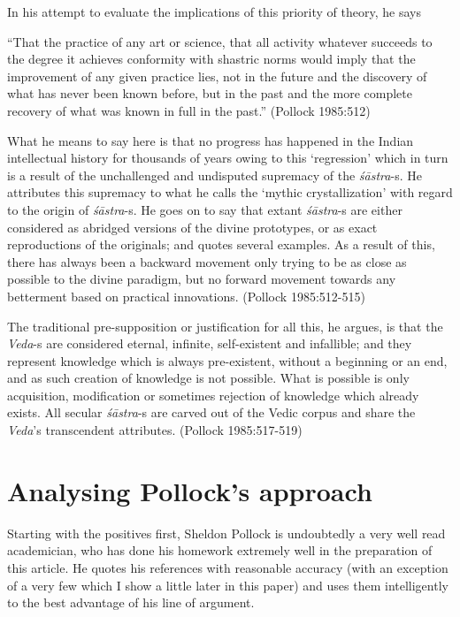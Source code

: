 In his attempt to evaluate the implications of this priority of theory, he says
\begin{myquote}
``That the practice of any art or science, that all activity whatever succeeds to the degree it achieves conformity with shastric norms would imply that the improvement of any given practice lies, not in the future and the discovery of what has never been known before, but in the past and the more complete recovery of what was known in full in the past.'' (Pollock 1985:512)
\end{myquote}

What he means to say here is that no progress has happened in the Indian intellectual history for thousands of years owing to this `regression' which in turn is a result of the unchallenged and undisputed supremacy of the {\sl śāstra}-s. He attributes this supremacy to what he calls the `mythic crystallization' with regard to the origin of {\sl śāstra}-s. He goes on to say that extant {\sl śāstra}-s are either considered as abridged versions of the divine prototypes, or as exact reproductions of the originals; and quotes several examples. As a result of this, there has always been a backward movement only trying to be as close as possible to the divine paradigm, but no forward movement towards any betterment based on practical innovations. (Pollock 1985:512-515)

The traditional pre-supposition or justification for all this, he argues, is that the {\sl Veda}-s are considered eternal, infinite, self-existent and infallible; and they represent knowledge which is always pre-existent, without a beginning or an end, and as such creation of knowledge is not possible. What is possible is only acquisition, modification or sometimes rejection of knowledge which already exists. All secular {\sl śāstra}-s are carved out of the Vedic corpus and share the {\sl Veda}'s transcendent attributes. (Pollock 1985:517-519)

\section*{Analysing Pollock's approach}

Starting with the positives first, Sheldon Pollock is undoubtedly a very well read academician, who has done his homework extremely well in the preparation of this article. He quotes his references with reasonable accuracy (with an exception of a very few which I show a little later in this paper) and uses them intelligently to the best advantage of his line of argument. 

